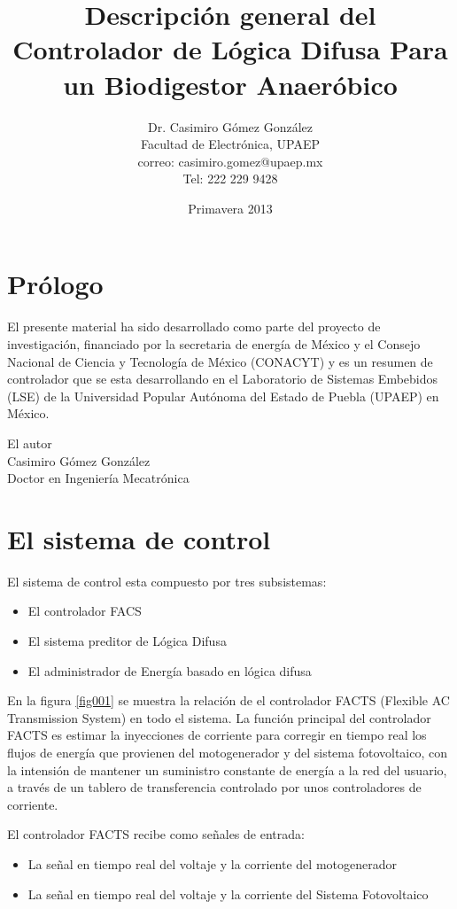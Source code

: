 \documentclass[12pt,letterpaper,twoside]{book}
\title{Descripción general del Controlador de Lógica Difusa Para un Biodigestor Anaeróbico}
\author{Dr. Casimiro Gómez González\\
	Facultad de Electrónica, UPAEP\\
               correo: casimiro.gomez@upaep.mx\\
               Tel: 222 229 9428}
\date{Primavera 2013}
\begin{document}
\frontmatter
\maketitle


\chapter{Prólogo}
El presente material ha sido desarrollado como parte del proyecto de investigación, financiado por la secretaria de energía de México y el Consejo Nacional de Ciencia y Tecnología de México (CONACYT) y es un resumen de controlador que se esta desarrollando en el Laboratorio de Sistemas Embebidos (LSE) de la Universidad Popular Autónoma del Estado de Puebla (UPAEP) en México.
\begin{flushright}

El autor\\
Casimiro Gómez González\\
Doctor en Ingeniería Mecatrónica
\end{flushright}


\mainmatter
\chapter{El sistema de control}

El sistema de control esta compuesto por tres subsistemas:
\begin{itemize}
\item El controlador FACS
\item El sistema preditor de Lógica Difusa
\item El administrador de Energía basado en lógica difusa
\end{itemize}
En la figura \ref{fig001} se muestra la relación de el controlador FACTS (Flexible AC Transmission System) en todo el sistema. La función principal del controlador FACTS es estimar la inyecciones de corriente para corregir en tiempo real los flujos de energía que provienen del motogenerador y del sistema fotovoltaico, con la intensión de mantener un suministro constante de energía a la red del usuario, a través de un tablero de transferencia controlado por unos controladores de corriente.

El controlador FACTS recibe como señales de entrada:

\begin{itemize}
\item La señal en tiempo real del voltaje y la corriente del motogenerador
\item La señal en tiempo real del voltaje y la corriente del Sistema Fotovoltaico
\end{itemize}
\end{document}
